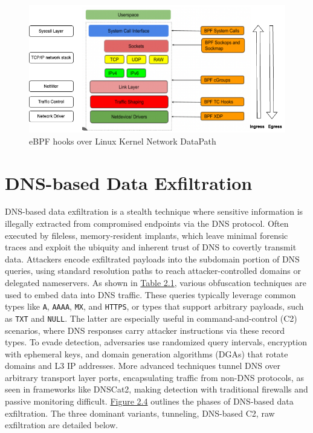 \documentclass [11pt, proquest] {uwthesis}[2020/02/24]
\begin{document}




\begin{figure}
\includegraphics[width=1.0\textwidth]{images/kernel_datapath.png}
\caption{eBPF hooks over Linux Kernel Network DataPath}
\label{sec:ebpf-hooks-kernel-network-datapath}
\end{figure}


\section{DNS-based Data Exfiltration}
DNS-based data exfiltration is a stealth technique where sensitive information is illegally extracted from compromised endpoints via the DNS protocol. Often executed by fileless, memory-resident implants, which leave minimal forensic traces and exploit the ubiquity and inherent trust of DNS to covertly transmit data. Attackers encode exfiltrated payloads into the subdomain portion of DNS queries, using standard resolution paths to reach attacker-controlled domains or delegated nameservers. As shown in \hyperref[dns_payload_obfuscation]{Table 2.1}, various obfuscation techniques are used to embed data into DNS traffic. These queries typically leverage common types like \texttt{A}, \texttt{AAAA}, \texttt{MX}, and \texttt{HTTPS}, or types that support arbitrary payloads, such as \texttt{TXT} and \texttt{NULL}. The latter are especially useful in command-and-control (C2) scenarios, where DNS responses carry attacker instructions via these record types. To evade detection, adversaries use randomized query intervals, encryption with ephemeral keys, and domain generation algorithms (DGAs) that rotate domains and L3 IP addresses. More advanced techniques tunnel DNS over arbitrary transport layer ports, encapsulating traffic from non-DNS protocols, as seen in frameworks like DNSCat2, making detection with traditional firewalls and passive monitoring difficult.
\hyperref[sec:dns c2 flow]{Figure 2.4} outlines the phases of DNS-based data exfiltration. The three dominant variants, tunneling, DNS-based C2, raw exfiltration are detailed below.
\end{document}
